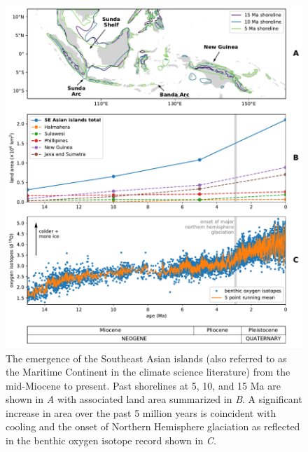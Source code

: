 \documentclass[9pt,twocolumn,twoside,lineno]{pnas-new}
\begin{document}
\begin{figure}
    \centering
    \includegraphics[width=13.0cm]{Figures/shoreline_growth.pdf}
    \caption{The emergence of the Southeast Asian islands (also referred to as the Maritime Continent in the climate science literature) from the mid-Miocene to present. Past shorelines at 5, 10, and 15 Ma are shown in \textit{A} with associated land area summarized in \textit{B}. A significant increase in area over the past 5 million years is coincident with cooling and the onset of Northern Hemisphere glaciation as reflected in the benthic oxygen isotope record \cite{Zachos2008a} shown in \textit{C}.}
    \label{fig:shoreline_growth}
\end{figure}
\end{document}
